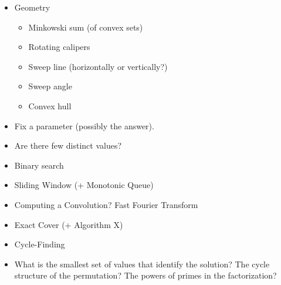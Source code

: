 \documentclass[9pt,a4paper,twocolumn,landscape,oneside]{amsart}
\begin{document}
\begin{itemize}
                \item Geometry
                    \begin{itemize}
                        \item Minkowski sum (of convex sets)
                        \item Rotating calipers
                        \item Sweep line (horizontally or vertically?)
                        \item Sweep angle
                        \item Convex hull
                    \end{itemize}
                \item Fix a parameter (possibly the answer).
                \item Are there few distinct values?
                \item Binary search
                \item Sliding Window (+ Monotonic Queue)
                \item Computing a Convolution? Fast Fourier Transform
                \item Exact Cover (+ Algorithm X)
                \item Cycle-Finding
                \item What is the smallest set of values that identify the solution? The cycle structure of the permutation? The powers of primes in the factorization?
            \end{itemize}
\end{document}
